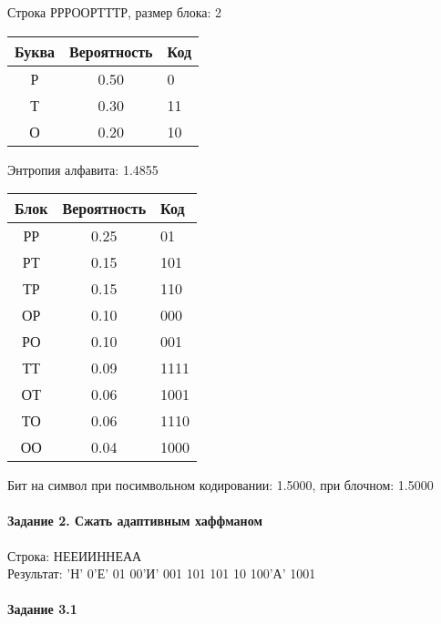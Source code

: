 \documentclass[a4paper, 12pt]{article}
\begin{document}
Строка РРРООРТТТР, размер блока: 2
\begin{center}
 \begin{tabular}{ |c|c|l| } 
  \hline
     Буква & Вероятность & Код\\ \hline
Р & 0.50 & 0\\\hline
Т & 0.30 & 11\\\hline
О & 0.20 & 10
\\ \hline \end{tabular}
\end{center}
Энтропия алфавита: 1.4855
\begin{center}
 \begin{tabular}{ |c|c|l| } 
  \hline
     Блок & Вероятность & Код\\ \hline
РР & 0.25 & 01\\\hline
РТ & 0.15 & 101\\\hline
ТР & 0.15 & 110\\\hline
ОР & 0.10 & 000\\\hline
РО & 0.10 & 001\\\hline
ТТ & 0.09 & 1111\\\hline
ОТ & 0.06 & 1001\\\hline
ТО & 0.06 & 1110\\\hline
ОО & 0.04 & 1000
\\ \hline \end{tabular}
\end{center}
Бит на символ при посимвольном кодировании: 1.5000, при блочном: 1.5000


\pagebreak
\paragraph{Задание 2. Сжать адаптивным хаффманом\\}

Строка: 
НЕЕИИННЕАА\\
Результат: 'Н' 0'Е' 01 00'И' 001 101 101 10 100'А' 1001










\pagebreak
\paragraph{Задание 3.1}
\end{document}
